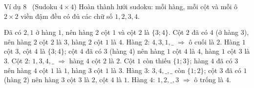 \begin{exbox}{Ví dụ 8 \ (Sudoku $4\times 4$)}
Hoàn thành lưới sudoku: mỗi hàng, mỗi cột và mỗi ô $2\times 2$ viền đậm đều có đủ các chữ số $1, 2, 3, 4$.
\begin{center}\end{center}
\guide
{}
Đã có $2, 1$ ở hàng $1$, nên hàng $2$ cột $1$ và cột $2$ là $\{3; 4\}$. Cột $2$ đã có $4$ (ở hàng $3$), nên
hàng $2$ cột $2$ là $3$, hàng $2$ cột $1$ là $4$.
Hàng $2$: $4, 3, 1, \_$ $\Rightarrow$ ô cuối là $2$. Hàng $1$ cột $3$, cột $4$ là $\{3; 4\}$; cột $4$ đã có $3$ (hàng $4$) nên
hàng $1$ cột $4$ là $4$, hàng $1$ cột $3$ là $3$.
Cột $2$: $1, 3, 4, \_$ $\Rightarrow$ hàng $4$ cột $2$ là $2$. Cột $1$ còn thiếu $\{1; 3\}$; hàng $4$ đã có $3$ nên hàng $4$ cột $1$ là $1$,
hàng $3$ cột $1$ là $3$.
Hàng $3$: $3, 4, \_, \_$ còn $\{1; 2\}$; cột $3$ đã có $1$ (hàng $2$) nên hàng $3$ cột $3$ là $2$, cột $4$ là $1$. Hàng $4$: $1, 2, \_, 3$ $\Rightarrow$ ô trống là $4$.
\begin{center}\end{center}
\end{exbox}

\clearpage
{}

